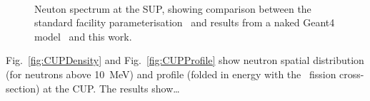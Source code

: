 \documentclass[11pt,a4paper]{IEEEtran}
\let\MYoriglatexcaption\caption
\renewcommand{\caption}[2][\relax]{\MYoriglatexcaption[#2]{#2}}
\def\U238{\BPChem{\^{238}U}}
\begin{document}
\begin{figure}[t]
    \vspace{2in}
	\\
    \vspace{2in}
	\caption{Neuton spectrum at the SUP, showing comparison between the standard facility parameterisation~\cite{Prokofiev2009} and results from a naked Geant4 model~\cite{Platt13} and this work.}
	\label{fig:SUPSpectraComparison}
\end{figure}

Fig.~\ref{fig:CUPDensity} and Fig.~\ref{fig:CUPProfile} show neutron spatial distribution (for neutrons above \SI{10}{\MeV}) and profile (folded in energy with the \U238\ fission cross-section) at the CUP.
The results show\ldots{}
\end{document}
